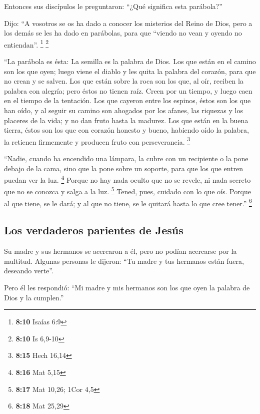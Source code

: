 \begin{paracol}{2}
 Entonces sus discípulos le preguntaron: ``¿Qué significa
esta parábola?''

 Dijo: ``A vosotros se os ha dado a conocer los misterios
del Reino de Dios, pero a los demás se les ha dado en parábolas, para
que ``viendo no vean y oyendo no entiendan''. \footnote{\textbf{8:10}
  Isaías 6:9} \footnote{\textbf{8:10} Is 6,9-10}

 ``La parábola es ésta: La semilla es la palabra de Dios.
 Los que están en el camino son los que oyen; luego viene
el diablo y les quita la palabra del corazón, para que no crean y se
salven.  Los que están sobre la roca son los que, al oír,
reciben la palabra con alegría; pero éstos no tienen raíz. Creen por un
tiempo, y luego caen en el tiempo de la tentación.  Los
que cayeron entre los espinos, éstos son los que han oído, y al seguir
su camino son ahogados por los afanes, las riquezas y los placeres de la
vida; y no dan fruto hasta la madurez.  Los que están en
la buena tierra, éstos son los que con corazón honesto y bueno, habiendo
oído la palabra, la retienen firmemente y producen fruto con
perseverancia. \footnote{\textbf{8:15} Hech 16,14}

 ``Nadie, cuando ha encendido una lámpara, la cubre con
un recipiente o la pone debajo de la cama, sino que la pone sobre un
soporte, para que los que entren puedan ver la luz. \footnote{\textbf{8:16}
  Mat 5,15}  Porque no hay nada oculto que no se revele,
ni nada secreto que no se conozca y salga a la luz. \footnote{\textbf{8:17}
  Mat 10,26; 1Cor 4,5}  Tened, pues, cuidado con lo que
oís. Porque al que tiene, se le dará; y al que no tiene, se le quitará
hasta lo que cree tener.'' \footnote{\textbf{8:18} Mat 25,29}

\hypertarget{los-verdaderos-parientes-de-jesuxfas}{%
\subsection{Los verdaderos parientes de
Jesús}\label{los-verdaderos-parientes-de-jesuxfas}}

 Su madre y sus hermanos se acercaron a él, pero no
podían acercarse por la multitud.  Algunas personas le
dijeron: ``Tu madre y tus hermanos están fuera, deseando verte''.

 Pero él les respondió: ``Mi madre y mis hermanos son los
que oyen la palabra de Dios y la cumplen.''


\end{paracol}
